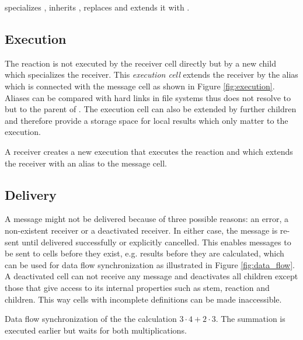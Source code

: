 { specializes , inherits , replaces  and extends it with .}

\subsection{Execution}
\label{sec:execution}

The reaction is not executed by the receiver cell directly but by a new child which specializes the receiver. This \textit{execution cell} extends the receiver by the alias  which is connected with the message cell as shown in Figure \ref{fig:execution}. Aliases can be compared with hard links in file systems thus  does not resolve to  but to the parent of . The execution cell can also be extended by further children and therefore provide a storage space for local results which only matter to the execution.

{A receiver creates a new execution that executes the reaction and which extends the receiver with an alias to the message cell.}

\subsection{Delivery}
\label{sec:delivery}

A message might not be delivered because of three possible reasons: an error, a non-existent receiver or a deactivated receiver. In either case, the message is re-sent until delivered successfully or explicitly cancelled. This enables messages to be sent to cells before they exist, e.g. results before they are calculated, which can be used for data flow synchronization as illustrated in Figure \ref{fig:data_flow}. A deactivated cell can not receive any message and deactivates all children except those that give access to its internal properties such as stem, reaction and children. This way cells with incomplete definitions can be made inaccessible.

{Data flow synchronization of the the calculation $3 \cdot 4 + 2 \cdot 3$. The summation is executed earlier but waits for both multiplications.}

